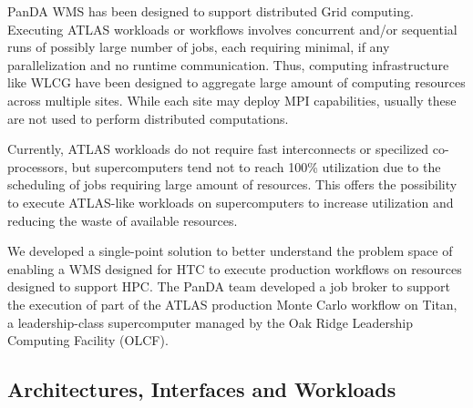 
PanDA WMS has been designed to support distributed Grid computing. Executing
ATLAS workloads or workflows involves concurrent and/or sequential runs of
possibly large number of jobs, each requiring minimal, if any parallelization
and no runtime communication. Thus, computing infrastructure like WLCG have
been designed to aggregate large amount of computing resources across
multiple sites. While each site may deploy MPI capabilities, usually these
are not used to perform distributed computations.

Currently, ATLAS workloads do not require fast interconnects or specilized
co-processors, but supercomputers tend not to reach 100\% utilization due to
the scheduling of jobs requiring large amount of resources. This offers the
possibility to execute ATLAS-like workloads on supercomputers to increase
utilization and reducing the waste of available resources.

We developed a single-point solution to better understand the problem space
of enabling a WMS designed for HTC to execute production workflows on
resources designed to support HPC\@. The PanDA team developed a job broker to
support the execution of part of the ATLAS production Monte Carlo workflow on
Titan, a leadership-class supercomputer managed by the Oak Ridge Leadership
Computing Facility (OLCF).

\subsection{Architectures, Interfaces and Workloads}\label{ssec:panda-titan}

